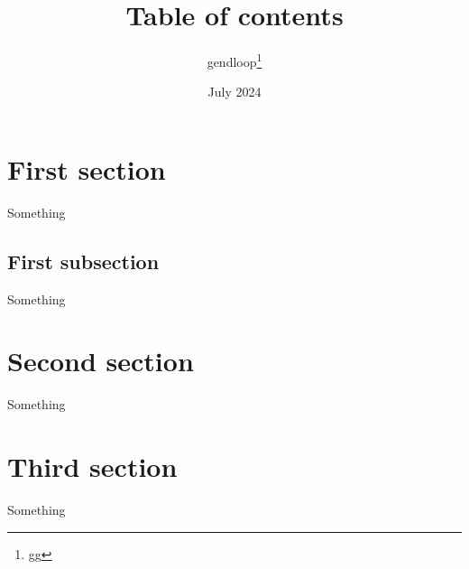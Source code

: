 \documentclass[12pt, a4paper]{article}
\title{Table of contents}
\author{gendloop\thanks{gg}}
\date{July 2024}
\begin{document}
\maketitle

\tableofcontents

\section{First section}
Something
\subsection{First subsection}
Something

\section*{Second section}
Something

\section{Third section}
Something
\end{document}

